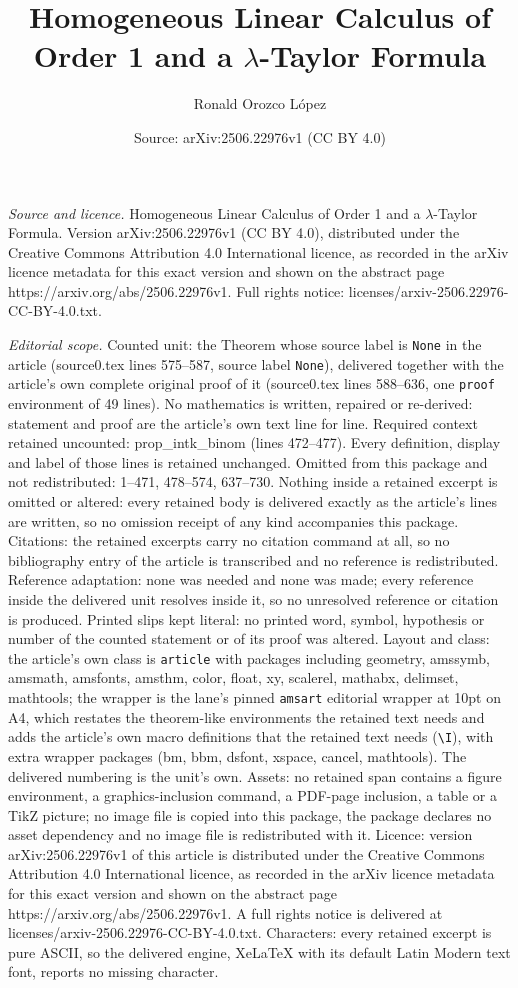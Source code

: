 \documentclass[10pt,a4paper]{amsart}
\title[Homogeneous Linear Calculus of Order 1 and a $\lambda$-Taylo]{Homogeneous Linear Calculus of Order 1 and a $\lambda$-Taylor Formula}
\author{Ronald Orozco L\'opez}
\date{Source: arXiv:2506.22976v1 (CC BY 4.0)}
\begin{document}
\maketitle

\noindent\emph{Source and licence.} Homogeneous Linear Calculus of Order 1 and a $\lambda$-Taylor Formula. Version arXiv:2506.22976v1 (CC BY 4.0), distributed under the Creative Commons Attribution 4.0 International licence, as recorded in the arXiv licence metadata for this exact version and shown on the abstract page https://arxiv.org/abs/2506.22976v1. Full rights notice: licenses/arxiv-2506.22976-CC-BY-4.0.txt.\par\smallskip

\noindent\textit{Editorial scope.} Counted unit: the Theorem whose source label is \texttt{None} in the article (source0.tex lines 575--587, source label \texttt{None}), delivered together with the article's own complete original proof of it (source0.tex lines 588--636, one \texttt{proof} environment of 49 lines). No mathematics is written, repaired or re-derived: statement and proof are the article's own text line for line. Required context retained uncounted: prop\_intk\_binom (lines 472--477). Every definition, display and label of those lines is retained unchanged. Omitted from this package and not redistributed: 1--471, 478--574, 637--730. Nothing inside a retained excerpt is omitted or altered: every retained body is delivered exactly as the article's lines are written, so no omission receipt of any kind accompanies this package. Citations: the retained excerpts carry no citation command at all, so no bibliography entry of the article is transcribed and no reference is redistributed. Reference adaptation: none was needed and none was made; every reference inside the delivered unit resolves inside it, so no unresolved reference or citation is produced. Printed slips kept literal: no printed word, symbol, hypothesis or number of the counted statement or of its proof was altered. Layout and class: the article's own class is \texttt{article} with packages including geometry, amssymb, amsmath, amsfonts, amsthm, color, float, xy, scalerel, mathabx, delimset, mathtools; the wrapper is the lane's pinned \texttt{amsart} editorial wrapper at 10pt on A4, which restates the theorem-like environments the retained text needs and adds the article's own macro definitions that the retained text needs (\texttt{\textbackslash I}), with extra wrapper packages (bm, bbm, dsfont, xspace, cancel, mathtools). The delivered numbering is the unit's own. Assets: no retained span contains a figure environment, a graphics-inclusion command, a PDF-page inclusion, a table or a TikZ picture; no image file is copied into this package, the package declares no asset dependency and no image file is redistributed with it. Licence: version arXiv:2506.22976v1 of this article is distributed under the Creative Commons Attribution 4.0 International licence, as recorded in the arXiv licence metadata for this exact version and shown on the abstract page https://arxiv.org/abs/2506.22976v1. A full rights notice is delivered at licenses/arxiv-2506.22976-CC-BY-4.0.txt. Characters: every retained excerpt is pure ASCII, so the delivered engine, XeLaTeX with its default Latin Modern text font, reports no missing character.
\end{document}
